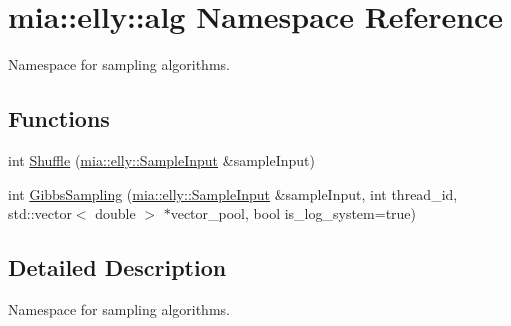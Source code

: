 \hypertarget{namespacemia_1_1elly_1_1alg}{\section{mia\-:\-:elly\-:\-:alg Namespace Reference}
\label{namespacemia_1_1elly_1_1alg}
}


Namespace for sampling algorithms.  


\subsection*{Functions}
\begin{DoxyCompactItemize}
\item 
int \hyperlink{namespacemia_1_1elly_1_1alg_ab8c9dff4bb66e3a9615525662a8f4af0}{Shuffle} (\hyperlink{classmia_1_1elly_1_1_sample_input}{mia\-::elly\-::\-Sample\-Input} \&sample\-Input)
\item 
int \hyperlink{namespacemia_1_1elly_1_1alg_a19a80aed51e58ec0661bd869af34c7d6}{Gibbs\-Sampling} (\hyperlink{classmia_1_1elly_1_1_sample_input}{mia\-::elly\-::\-Sample\-Input} \&sample\-Input, int thread\-\_\-id, std\-::vector$<$ double $>$ $\ast$vector\-\_\-pool, bool is\-\_\-log\-\_\-system=true)
\end{DoxyCompactItemize}


\subsection{Detailed Description}
Namespace for sampling algorithms. 

